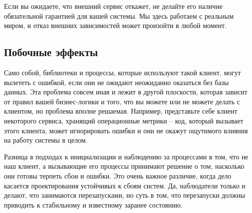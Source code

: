 \documentclass[11pt, oneside]{book}   	%
\begin{document}
Если вы ожидаете, что внешний сервис откажет, не делайте его наличие обязательной гарантией для вашей системы. Мы здесь работаем с реальным миром, и отказ внешних зависимостей может произойти в любой момент.


\subsection{Побочные эффекты}
\label{subsec:start-link-side-effects}

Само собой, библиотеки и процессы, которые используют такой клиент, могут вылететь с ошибкой, если они не ожидают неожиданно оказаться без базы данных. Эта проблема совсем иная и лежит в другой плоскости, которая зависит от правил вашей бизнес-логики и того, что вы можете или не можете делать с клиентом, но проблема вполне решаемая. Например, представьте себе клиент некоторого сервиса, хранящий операционные метрики -- код, который вызывает этого клиента, может игнорировать ошибки и они не окажут ощутимого влияния на работу системы в целом.

Разница в подходах к инициализации и наблюдению за процессами в том, что не наш клиент, а вызывающие его процессы принимают решение о том, насколько они готовы терпеть сбои и ошибки. Это очень важное различие, когда дело касается проектирования устойчивых к сбоям систем. Да, наблюдатели только и делают, что занимаются перезапусками, но суть в том, что перезапуски должны приводить к стабильному и известному заранее состоянию.
\end{document}
